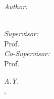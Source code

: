 \begin{titlingpage}
\begin{center}
		\begin{minipage}[t]{0.3\textwidth}
			\begin{flushleft} \large
				\emph{Author:}\\
				\textcolor{SchoolColor}{\AuthorName \ \textsc{\AuthorSurname}} %
			\end{flushleft}
		\end{minipage}
		\begin{minipage}[t]{0.68\textwidth}
			\begin{flushright} \large
				\emph{Supervisor:} \\
				\textcolor{SchoolColor}{Prof. \SupName \ \textsc{\SupSurname}} %
				\vspace{10pt}\\
				\emph{Co-Supervisor:} \\
				\textcolor{SchoolColor}{Prof. \CosupName \ \textsc{\CosupSurname}} %
			\end{flushright}
		\end{minipage}

		\vfill
		\large{\textit{A.Y.} \AcademicYear}\\
		{\UnivPlace, \Date}
	\end{center}
\end{titlingpage}
